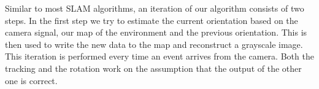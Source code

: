 Similar to most SLAM algorithms, an iteration of our algorithm consists of two steps. In the first step we try to estimate the current orientation based on the camera signal, our map of the environment and the previous orientation. This is then used to write the new data to the map and reconstruct a grayscale image. This iteration is performed every time an event arrives from the camera. Both the tracking and the rotation work on the assumption that the output  of the other one is correct.